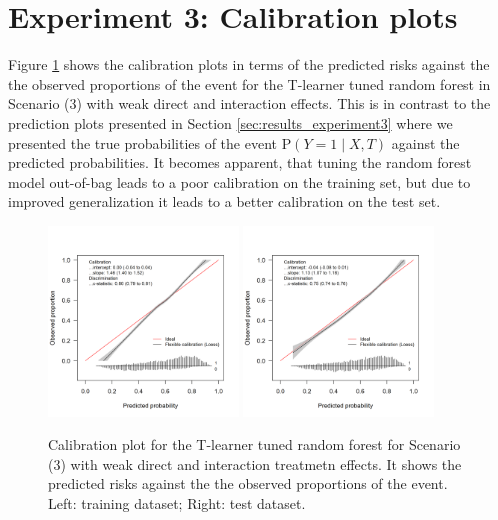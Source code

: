\clearpage


\section{Experiment 3: Calibration plots} \label{sec:calibration_tuned_rf}

Figure \ref{fig:calibration_tuned_rf} shows the calibration plots in terms of the predicted risks against the the observed proportions of the event for the T-learner tuned random forest in Scenario (3) with weak direct and interaction effects. This is in contrast to the prediction plots presented in Section \ref{sec:results_experiment3} where we presented the true probabilities of the event $\text{P}(Y=1 \mid X, T)$ against the predicted probabilities. It becomes apparent, that tuning the random forest model out-of-bag leads to a poor calibration on the training set, but due to improved generalization it leads to a better calibration on the test set.

\begin{figure}[htbp]
\centering
\includegraphics[width=0.45\textwidth]{img/results_ITE_simulation/small_interaction_tuned_rf_tlearnertrain_calibration_plot.png}
\includegraphics[width=0.45\textwidth]{img/results_ITE_simulation/small_interaction_tuned_rf_tlearnertest_calibration_plot.png}
\caption{Calibration plot for the T-learner tuned random forest for Scenario (3) with weak direct and interaction treatmetn effects. It shows the predicted risks against the the observed proportions of the event. Left: training dataset; Right: test dataset.}
\label{fig:calibration_tuned_rf}
\end{figure}



